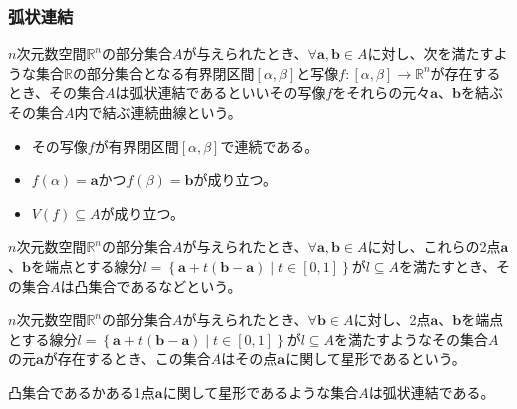 \documentclass[dvipdfmx]{jsarticle}
\begin{document}
\subsubsection{弧状連結}%
\begin{dfn}
$n$次元数空間$\mathbb{R}^{n}$の部分集合$A$が与えられたとき、$\forall\mathbf{a},\mathbf{b} \in A$に対し、次を満たすような集合$\mathbb{R}$の部分集合となる有界閉区間$[\alpha,\beta]$と写像$f:[\alpha,\beta] \rightarrow \mathbb{R}^{n}$が存在するとき、その集合$A$は弧状連結であるといいその写像$f$をそれらの元々$\mathbf{a}$、$\mathbf{b}$を結ぶその集合$A$内で結ぶ連続曲線という。
\begin{itemize}
\item
  その写像$f$が有界閉区間$[\alpha,\beta]$で連続である。
\item
  $f(\alpha) = \mathbf{a}$かつ$f(\beta) = \mathbf{b}$が成り立つ。
\item
  $V(f) \subseteq A$が成り立つ。
\end{itemize}
\end{dfn}
\begin{dfn}
$n$次元数空間$\mathbb{R}^{n}$の部分集合$A$が与えられたとき、$\forall\mathbf{a},\mathbf{b} \in A$に対し、これらの2点$\mathbf{a}$、$\mathbf{b}$を端点とする線分$l = \left\{ \mathbf{a} + t\left( \mathbf{b} - \mathbf{a} \right) \middle| t \in [ 0,1] \right\}$が$l \subseteq A$を満たすとき、その集合$A$は凸集合であるなどという。
\end{dfn}
\begin{dfn}
$n$次元数空間$\mathbb{R}^{n}$の部分集合$A$が与えられたとき、$\forall\mathbf{b} \in A$に対し、2点$\mathbf{a}$、$\mathbf{b}$を端点とする線分$l = \left\{ \mathbf{a} + t\left( \mathbf{b} - \mathbf{a} \right) \middle| t \in [ 0,1] \right\}$が$l \subseteq A$を満たすようなその集合$A$の元$\mathbf{a}$が存在するとき、この集合$A$はその点$\mathbf{a}$に関して星形であるという。
\end{dfn}
\begin{thm}\label{4.1.12.11}
凸集合であるかある1点$\mathbf{a}$に関して星形であるような集合$A$は弧状連結である。
\end{thm}
\end{document}
